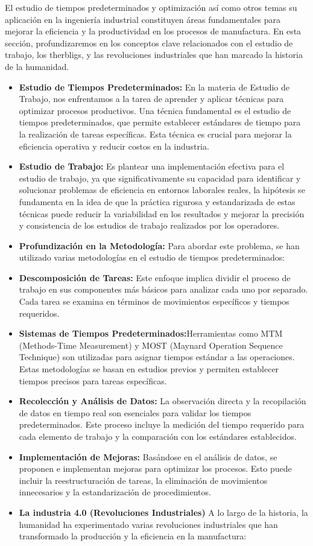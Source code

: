     El estudio de tiempos predeterminados y optimización así como otros temas  su aplicación en la ingeniería industrial constituyen áreas fundamentales para mejorar la eficiencia y la productividad en los procesos de manufactura. En esta sección, profundizaremos en los conceptos clave relacionados con el estudio de trabajo, los therbligs, y las revoluciones industriales que han marcado la historia de la humanidad.
    \begin{itemize}
    \item \textbf{Estudio de Tiempos Predeterminados:}
    En la materia de Estudio de Trabajo, nos enfrentamos a la tarea de aprender y aplicar técnicas para optimizar procesos productivos. Una técnica fundamental es el estudio de tiempos predeterminados, que permite establecer estándares de tiempo para la realización de tareas específicas. Esta técnica es crucial para mejorar la eficiencia operativa y reducir costos en la industria.
    \item \textbf{Estudio de Trabajo:}
    Es plantear una implementación efectiva para el estudio de trabajo, ya que significativamente su capacidad para identificar y solucionar problemas de eficiencia en entornos laborales reales, la hipótesis se fundamenta en la idea de que la práctica rigurosa y estandarizada de estas técnicas puede reducir la variabilidad en los resultados y mejorar la precisión y consistencia de los estudios de trabajo realizados por los operadores.
    \item \textbf{Profundización en la Metodología:}
    Para abordar este problema, se han utilizado varias metodologías en el estudio de tiempos predeterminados:
    \item \textbf{Descomposición de Tareas:} Este enfoque implica dividir el proceso de trabajo en sus componentes más básicos para analizar cada uno por separado. Cada tarea se examina en términos de movimientos específicos y tiempos requeridos.
    \item \textbf{Sistemas de Tiempos Predeterminados:}Herramientas como MTM (Methods-Time Measurement) y MOST (Maynard Operation Sequence Technique) son utilizadas para asignar tiempos estándar a las operaciones. Estas metodologías se basan en estudios previos y permiten establecer tiempos precisos para tareas específicas.
    \item \textbf{Recolección y Análisis de Datos:}
    La observación directa y la recopilación de datos en tiempo real son esenciales para validar los tiempos predeterminados. Este proceso incluye la medición del tiempo requerido para cada elemento de trabajo y la comparación con los estándares establecidos.
    \item \textbf{Implementación de Mejoras:}
    Basándose en el análisis de datos, se proponen e implementan mejoras para optimizar los procesos. Esto puede incluir la reestructuración de tareas, la eliminación de movimientos innecesarios y la estandarización de procedimientos.
    \cite{Maynard}
    \item \textbf{La industria 4.0 (Revoluciones Industriales)}
    A lo largo de la historia, la humanidad ha experimentado varias revoluciones industriales que han transformado la producción y la eficiencia en la manufactura:
    

\end{itemize}
